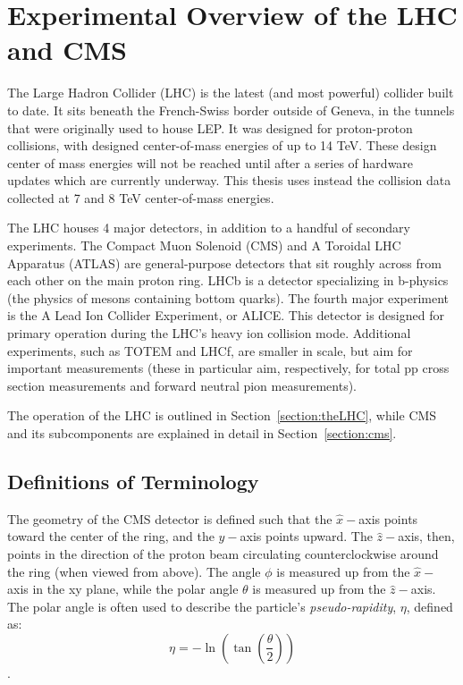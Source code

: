 \chapter{Experimental Overview of the LHC and CMS}

\label{chapter:expOverview}
The Large Hadron Collider (LHC) is the latest (and most powerful) collider built
to date. It sits beneath the French-Swiss border outside of Geneva, in the
tunnels that were originally used to house LEP. It was designed for
proton-proton collisions, with designed center-of-mass energies of up to 14 TeV.
These design center of mass energies will not be reached until after a series of
hardware updates which are currently underway. This thesis uses instead the
collision data collected at 7 and 8 TeV center-of-mass energies.

The LHC houses 4 major detectors, in addition to a handful of secondary
experiments. The Compact Muon Solenoid (CMS) and A Toroidal LHC Apparatus
(ATLAS) are general-purpose detectors that sit roughly across from each other on
the main proton ring. LHCb is a detector specializing in b-physics (the physics
of mesons containing bottom quarks). The fourth major experiment is the A Lead
Ion Collider Experiment, or ALICE. This detector is designed for primary
operation during the LHC's heavy ion collision mode. Additional experiments,
such as TOTEM and LHCf, are smaller in scale, but aim for important measurements
(these in particular aim, respectively, for total pp cross section measurements
and forward neutral pion measurements).

The operation of the LHC is outlined in Section~\ref{section:theLHC}, while CMS
and its subcomponents are explained in detail in Section~\ref{section:cms}.

\section{Definitions of Terminology}

The geometry of the CMS detector is defined such that the $\hat x-$axis points
toward the center of the ring, and the $\hat y-$axis points upward. The $\hat
z-$axis, then, points in the direction of the proton beam circulating
counterclockwise around the ring (when viewed from above). The angle $\phi$ is
measured up from the $\hat x-$axis in the xy plane, while the polar angle
$\theta$ is measured up from the $\hat z-$axis. The polar angle is often used to
describe the particle's \emph{pseudo-rapidity}, $\eta$, defined as:
\begin{equation*}
    \eta = - \ln \left(\tan ( \frac{\theta}{2}) \right) 
\end{equation*}.

